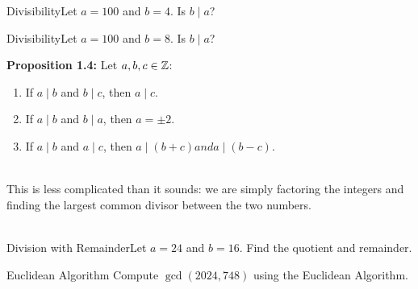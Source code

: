 \begin{example}
    {Divisibility}Let \(a = 100\) and \(b = 4\). Is \(b \mid a\)?
\end{example}


\begin{example}
    {Divisibility}Let \(a = 100\) and \(b = 8\). Is \(b \mid a\)?
\end{example}


\textbf{Proposition 1.4:} Let $a,b,c \in \mathbb{Z}$:
\begin{enumerate}
    \item If $a \mid b$ and $b \mid c$, then $a \mid c$.
    \item If $a \mid b$ and $b \mid a$, then $a = \pm 2$.
    \item If $a \mid b$ and $a \mid c$, then $a \mid (b + c) and a \mid (b - c)$.
\end{enumerate}


 \\

This is less complicated than it sounds: we are simply factoring the integers and finding the largest common divisor between the two numbers. \\

 \\

\begin{example}
    {Division with Remainder}Let $a = 24$ and $b = 16$. Find the quotient and remainder.
\end{example}

\begin{example}
    {Euclidean Algorithm} Compute \(\gcd(2024, 748)\) using the Euclidean Algorithm.
\end{example}

